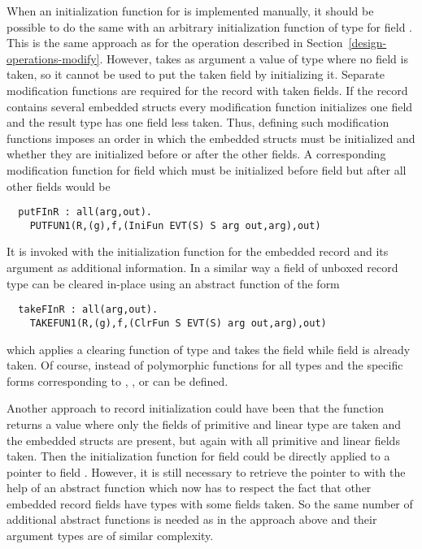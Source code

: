 When an initialization function for  is implemented
manually, it should be possible to do the same with an arbitrary initialization function of type 
for field . This is the same approach as for the operation  described in Section~\ref{design-operations-modify}.
However,  takes as argument a value of type 
where no field is taken, so it cannot be used to put the taken field  by initializing it. Separate modification functions
are required for the record with taken fields. If the record contains several embedded structs every modification function
initializes one field and the result type has one field less taken. Thus, defining such modification functions imposes an order
in which the embedded structs must be initialized and whether they are initialized before or after the other fields. A corresponding
modification function for field  which must be initialized before field  but after all other fields would be
\begin{verbatim}
  putFInR : all(arg,out). 
    PUTFUN1(R,(g),f,(IniFun EVT(S) S arg out,arg),out)
\end{verbatim}
It is invoked with the initialization function for the embedded record and its argument 
as additional information. In a similar way a field of unboxed record type  can be cleared in-place using an abstract
function of the form
\begin{verbatim}
  takeFInR : all(arg,out).
    TAKEFUN1(R,(g),f,(ClrFun S EVT(S) arg out,arg),out)
\end{verbatim}
which applies a clearing function of type  and takes the field  while field  
is already taken. Of course, instead of polymorphic functions for all types  and  the specific forms
corresponding to , , or  can be defined.

Another approach to record initialization could have been that the function  returns a value where 
only the fields of primitive and linear type
are taken and the embedded structs are present, but again with all primitive and linear fields taken. Then the initialization function for
field  could be directly applied to a pointer to field . However, it is still necessary to retrieve the pointer to 
with the help of an abstract function which now has to respect the fact that other embedded record fields have types with
some fields taken. So the same number of additional abstract functions is needed as in the approach above and their argument
types are of similar complexity.

